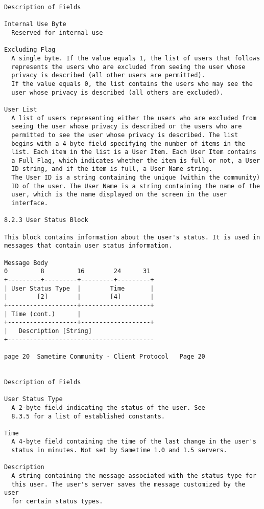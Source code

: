 \documentclass[titlepage,oneside]{book}
\begin{document}
\begin{verbatim}
Description of Fields

Internal Use Byte
  Reserved for internal use

Excluding Flag
  A single byte. If the value equals 1, the list of users that follows
  represents the users who are excluded from seeing the user whose
  privacy is described (all other users are permitted).
  If the value equals 0, the list contains the users who may see the
  user whose privacy is described (all others are excluded).

User List
  A list of users representing either the users who are excluded from
  seeing the user whose privacy is described or the users who are
  permitted to see the user whose privacy is described. The list
  begins with a 4-byte field specifying the number of items in the
  list. Each item in the list is a User Item. Each User Item contains
  a Full Flag, which indicates whether the item is full or not, a User
  ID string, and if the item is full, a User Name string.
  The User ID is a string containing the unique (within the community)
  ID of the user. The User Name is a string containing the name of the
  user, which is the name displayed on the screen in the user
  interface.

8.2.3 User Status Block

This block contains information about the user's status. It is used in
messages that contain user status information.

Message Body
0         8         16        24      31
+---------+---------+---------+---------+
| User Status Type  |        Time       |
|        [2]        |        [4]        |
+-------------------+-------------------+
| Time (cont.)      |
+-------------------+-------------------+
|   Description [String]
+----------------------------------------

page 20  Sametime Community - Client Protocol   Page 20


Description of Fields

User Status Type
  A 2-byte field indicating the status of the user. See 
  8.3.5 for a list of established constants.

Time
  A 4-byte field containing the time of the last change in the user's
  status in minutes. Not set by Sametime 1.0 and 1.5 servers.

Description
  A string containing the message associated with the status type for
  this user. The user's server saves the message customized by the user
  for certain status types.


\end{verbatim}
\end{document}
